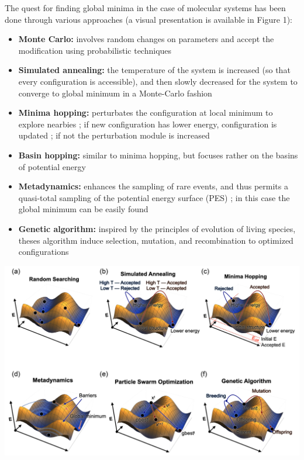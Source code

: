 \documentclass[11pt]{article}
\begin{document}
\begin{multicols}{2}
\noindent The quest for finding global minima in the case of molecular systems has been done through various approaches (a visual presentation is available in Figure 1):
\begin{itemize}
    \itemsep0em
    \item \textbf{Monte Carlo:} involves random changes on parameters and accept the modification using probabilistic techniques \cite{PhysRevB.95.144104}
    \item \textbf{Simulated annealing:} the temperature of the system is increased (so that every configuration is accessible), and then slowly decreased for the system to converge to global minimum in a Monte-Carlo fashion \cite{B003447I}
    \item \textbf{Minima hopping:} perturbates the configuration at local minimum to explore nearbies ; if new configuration has lower energy, configuration is updated ; if not the perturbation module is increased \cite{minima_hopping}
    \item \textbf{Basin hopping:} similar to minima hopping, but focuses rather on the basins of potential energy
    \item \textbf{Metadynamics:} enhances the sampling of rare events, and thus permits a quasi-total sampling of the potential energy surface (PES) ; in this case the global minimum can be easily found \cite{C2CE06642D}
    \item \textbf{Genetic algorithm:} inspired by the principles of evolution of living species, theses algorithm induce selection, mutation, and recombination to optimized configurations \cite{Falls2020}
\end{itemize}
\bigskip

              \noindent \includegraphics[width=\columnwidth]{figures/optim_figures.png}
                \medskip


\end{multicols}
\end{document}
